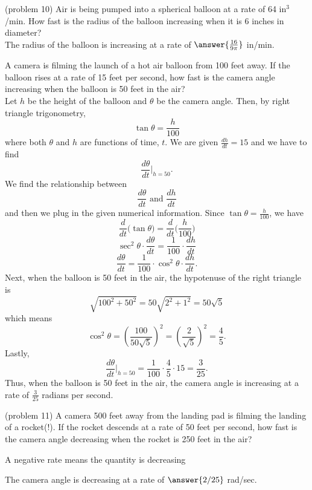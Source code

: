 \documentclass[handout]{ximera}
\begin{document}
\begin{problem}(problem 10)
Air is being pumped into a spherical balloon at a rate of 64 in$^3$/min. How fast is the radius of the balloon
increasing when it is 6 inches in diameter?\\


The radius of the balloon is increasing at a rate of $\answer{\frac{16}{9\pi}}$ in/min.
\end{problem}



\begin{example}[example 11]
A camera is filming the launch of a hot air balloon from 100 feet away. 
If the balloon rises at a rate of 15 feet per second, how fast is the camera angle increasing when the balloon is 50 feet in the air?\\
Let $h$ be the height of the balloon and $\theta$ be the camera angle. Then, by right triangle trigonometry, 
\[\tan \theta  = \frac{h}{100}\]
where both $\theta$ and $h$ are functions of time, $t$.
We are given $\frac{dh}{dt} = 15$ and we have to find
\[\frac{d\theta}{dt}\bigg|_{h = 50}.\]
We find the relationship between 
\[\frac{d\theta}{dt} \text{ and } \frac{dh}{dt}\]
and then we plug in the given numerical information.
Since $\tan\theta = \frac{h}{100}$, we have
\[\frac{d}{dt}\big(\tan\theta\big) = \frac{d}{dt} \Big(\frac{h}{100}\Big)\]
 \[\sec^2 \theta \cdot \frac{d\theta}{dt} = \frac{1}{100} \cdot \frac{dh}{dt}\]
\[ \frac{d\theta}{dt} = \frac{1}{100}\cdot\cos^2 \theta  \cdot\frac{dh}{dt}.\]
Next, when the balloon is 50 feet in the air, the hypotenuse of the right triangle is 
\[\sqrt{100^2 + 50^2} = 50\sqrt{2^2 + 1^2} = 50\sqrt 5\]
which means 
\[\cos^2 \theta = \left(\frac{100}{50\sqrt 5}\right)^2 = \left(\frac{2}{\sqrt 5}\right)^2 = \frac45.\]
Lastly,
\[\frac{d\theta}{dt}\bigg|_{h = 50}= \frac{1}{100} \cdot \frac45 \cdot 15 = \frac{3}{25}.\]
Thus, when the balloon is 50 feet in the air, the camera angle is increasing at a rate of $\frac{3}{25}$ radians per second.
\end{example}


\begin{problem}(problem 11)
A camera 500 feet away from the landing pad is filming the landing of a rocket(!).
If the rocket descends at a rate of 50 feet per second, how fast is the camera angle decreasing when the 
rocket is 250 feet in the air?\\

\begin{hint} 
A negative rate means the quantity is decreasing
\end{hint}

The camera angle is decreasing at a rate of $\answer{2/25}$ rad/sec.

\end{problem}
\end{document}
